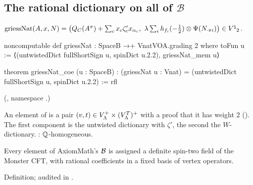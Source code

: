 \subsection{The rational dictionary on all of \texorpdfstring{$\mathcal B$}{B}}

\begin{definition}\label{ch21:def:griessNat}
$\mathrm{griessNat}(A,x,N)=\bigl(Q_C(A^\pi)+\sum_cx_c\zeta'_cx_{\alpha_c},\ \lambda\sum_ih_{f_i}(-\tfrac12)\otimes\Psi(N_{\cdot\pi i})\bigr)\in\Vnat_2$.
\end{definition}
\begin{leancode}
noncomputable def griessNat : SpaceB →+ VnatVOA.grading 2 where
  toFun u := ⟨(untwistedDict fullShortSign u, spinDict u.2.2), griessNat_mem u⟩
\end{leancode}
\begin{leancode}
theorem griessNat_coe (u : SpaceB) :
    (griessNat u : Vnat) = (untwistedDict fullShortSign u, spinDict u.2.2) := rfl
\end{leancode}
(, namespace .)
\begin{dictionary}
An element of  is a pair $(v,t)\in V_{\Lambda}^+\times(V_{\Lambda}^T)^+$ with a proof
that it has weight $2$ ().  The first component is the untwisted dictionary with
$\zeta'$, the second the $W$-dictionary.  : ${\mathbb{Q}}$-homogeneous.
\end{dictionary}
\begin{physics}
Every element of AxiomMath's $\mathcal{B}$ is assigned a definite spin-two field of the Monster CFT, with
rational coefficients in a fixed basis of vertex operators.
\end{physics}
\begin{status}
Definition; audited in .
\end{status}

